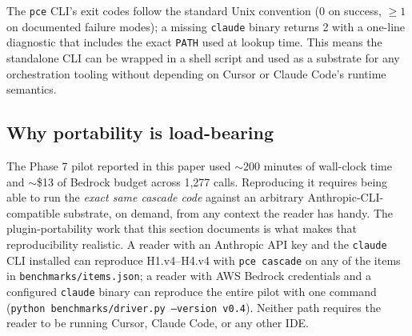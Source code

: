 The \texttt{pce} CLI's exit codes follow the standard Unix convention (0 on success, $\geq 1$ on documented failure modes); a missing \texttt{claude} binary returns 2 with a one-line diagnostic that includes the exact \texttt{PATH} used at lookup time. This means the standalone CLI can be wrapped in a shell script and used as a substrate for any orchestration tooling without depending on Cursor or Claude Code's runtime semantics.

\subsection{Why portability is load-bearing}

The Phase 7 pilot reported in this paper used $\sim$200 minutes of wall-clock time and $\sim$\$13 of Bedrock budget across 1,277 calls. Reproducing it requires being able to run the \emph{exact same cascade code} against an arbitrary Anthropic-CLI-compatible substrate, on demand, from any context the reader has handy. The plugin-portability work that this section documents is what makes that reproducibility realistic. A reader with an Anthropic API key and the \texttt{claude} CLI installed can reproduce H1.v4--H4.v4 with \texttt{pce cascade} on any of the items in \texttt{benchmarks/items.json}; a reader with AWS Bedrock credentials and a configured \texttt{claude} binary can reproduce the entire pilot with one command (\texttt{python benchmarks/driver.py --version v0.4}). Neither path requires the reader to be running Cursor, Claude Code, or any other IDE.
